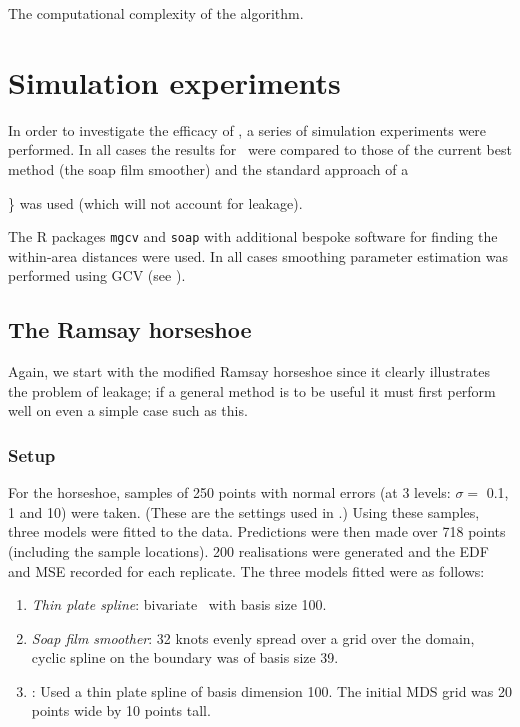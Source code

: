 The computational complexity of the algorithm.





\section{Simulation experiments}
\label{mdssims}

In order to investigate the efficacy of \mdsap, a series of simulation experiments were performed. In all cases the results for \mdsap\ were compared to those of the current best method (the soap film smoother) and the standard approach of a {\tprs\} was used (which will not account for leakage).

The \textsf{R} packages \texttt{mgcv} and \texttt{soap} with additional bespoke software for finding the within-area distances were used. In all cases smoothing parameter estimation was performed using GCV (see ).

\subsection{The Ramsay horseshoe}

Again, we start with the modified Ramsay horseshoe since it clearly illustrates the problem of leakage; if a general method is to be useful it must first perform well on even a simple case such as this.

\subsubsection{Setup}

For the horseshoe, samples of 250 points with normal errors (at 3 levels:  $\sigma= $ 0.1, 1 and 10) were taken. (These are the settings used in \cite{soap}.) Using these samples, three models were fitted to the data. Predictions were then made over 718 points (including the sample locations). 200 realisations were generated and the EDF and MSE recorded for each replicate. The three models fitted were as follows:

\begin{enumerate}
\item \emph{Thin plate spline}: bivariate \tprs\  with basis size 100.
\item \emph{Soap film smoother}: 32 knots evenly spread over a grid over the domain, cyclic spline on the boundary was of basis size 39.
\item \emph{\mdsap}: Used a thin plate spline of basis dimension 100. The initial MDS grid was 20 points wide by 10 points tall.
\end{enumerate} 

}

